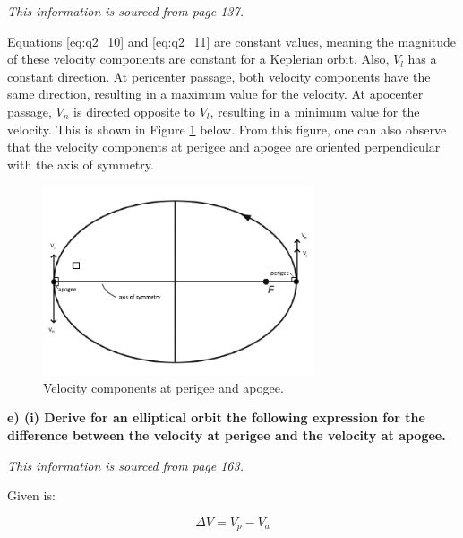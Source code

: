 \bigskip

\noindent \textit{This information is sourced from \cite{wakker} page 137.}

\bigskip

\noindent Equations \ref{eq:q2_10} and \ref{eq:q2_11} are constant values, meaning the magnitude of these velocity components are constant for a Keplerian orbit. Also, $V_{l}$ has a constant direction. At pericenter passage, both velocity components have the same direction, resulting in a maximum value for the velocity. At apocenter passage, $V_{n}$ is directed opposite to $V_{l}$, resulting in a minimum value for the velocity. This is shown in Figure \ref{fig:whittaker} below. From this figure, one can also observe that the velocity components at perigee and apogee are oriented perpendicular with the axis of symmetry.

\begin{figure}[ht]
    \centering
    \includegraphics[width=8cm]{img/whittaker.jpg}
    \caption{Velocity components at perigee and apogee.}
    \label{fig:whittaker}
\end{figure}











\noindent \textbf{e) (i) Derive for an elliptical orbit the following expression for the difference between the velocity at perigee and the velocity at apogee.}

\bigskip

\noindent \textit{This information is sourced from \cite{wakker} page 163.}

\bigskip

\noindent Given is:

\begin{equation}
    \Delta V = V_{p} - V_{a}
    \label{eq:q2_e1}
\end{equation}

